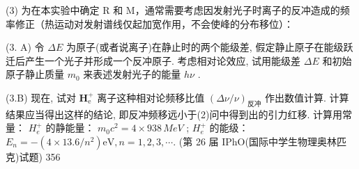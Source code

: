 (3) 为在本实验中确定 R 和 M，通常需要考虑因发射光子时离子的反冲造成的频率修正（热运动对发射谱线仅起加宽作用，不会使峰的分布移位）：

(3. A) 令 $\Delta E$ 为原子(或者说离子)在静止时的两个能级差, 假定静止原子在能级跃迁后产生一个光子并形成一个反冲原子. 考虑相对论效应, 试用能级差 $\Delta E$ 和初始原子静止质量 $m_0$ 来表述发射光子的能量 $h\nu$ .

(3.B) 现在, 试对 $\mathbf{H}_{\mathrm{e}}^{+}$ 离子这种相对论频移比值 $(\Delta \nu / \nu)_{\text{反冲}}$ 作出数值计算. 计算结果应当得出这样的结论, 即反冲频移远小于(2)问中得到出的引力红移.
计算用常量：
$H_{e}^{+}$ 的静能量： $m_{0}c^{2}=4\times938\,MeV$ ;
$H_{e}^{+}$ 的能级： $E_{n}=-(4\times13.6/n^{2})\mathrm{eV}, n=1,2,3,\cdots.$ 
(第 26 届 IPhO(国际中学生物理奥林匹克)试题)
356 
